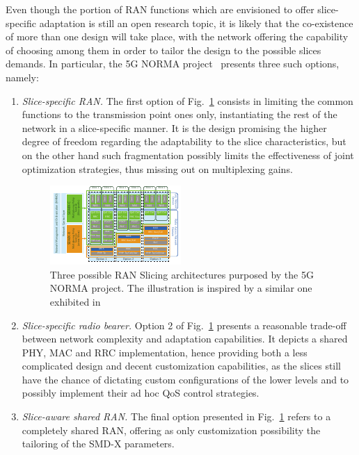 \documentclass[11pt]{book}
\begin{document}
Even though the portion of RAN functions which are envisioned to offer slice-specific adaptation is still an open research topic, it is likely that the co-existence of more than one design will take place, with the network offering the capability of choosing among them in order to tailor the design to the possible slices demands. In particular, the 5G NORMA project~\cite{normaSpec2} presents three such options, namely:
\begin{enumerate}[noitemsep, topsep=0.2pt]
\item \textit{Slice-specific RAN.} The first option of Fig.~\ref{Fig:RANArchi} consists in limiting the common functions to the transmission point ones only, instantiating the rest of the network in a slice-specific manner. It is the design promising the higher degree of freedom regarding the adaptability to the slice characteristics, but on the other hand such fragmentation possibly limits the effectiveness of joint optimization strategies, thus missing out on multiplexing gains.
\begin{figure}[!ht]
    \centering
    \includegraphics[scale=3.95]{figures/RANArchi.pdf}
     \setlength\belowcaptionskip{-.1cm}
  \caption{Three possible RAN Slicing architectures purposed by the 5G NORMA project. The illustration is inspired by a similar one exhibited in~\cite{normaSpec2}}
    \label{Fig:RANArchi}
\end{figure}
\item \textit{Slice-specific radio bearer.} Option 2 of Fig.~\ref{Fig:RANArchi} presents a reasonable trade-off between network complexity and adaptation capabilities. It depicts a shared PHY, MAC and RRC implementation, hence providing both a less complicated design and decent customization capabilities, as the slices still have the chance of dictating custom configurations of the lower levels and to possibly implement their ad hoc QoS control strategies.
\item \textit{Slice-aware shared RAN.} The final option presented in Fig.~\ref{Fig:RANArchi} refers to a completely shared RAN, offering as only customization possibility the tailoring of the SMD-X parameters.
\end{enumerate}
\end{document}
